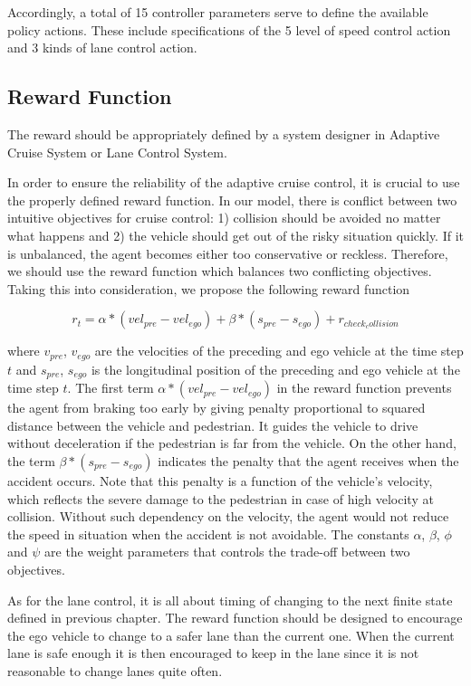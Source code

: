 Accordingly, a total of 15 controller parameters serve to define the available policy actions. These include specifications of the 5 level of speed control action and 3 kinds of lane control action.

\subsection{Reward Function}

The reward should be appropriately defined by a system designer in Adaptive Cruise System or Lane Control System.

In order to ensure the reliability of the adaptive cruise control, it is crucial to use the properly defined reward function. In our model, there is conflict between two intuitive objectives for cruise control: 1) collision should be avoided no matter what happens and 2) the vehicle should get out of the risky situation quickly. If it is unbalanced, the agent becomes either too conservative or reckless. Therefore, we should use the reward function which balances two conflicting objectives. Taking this into consideration, we propose the following reward function

\begin{equation} \label{eq:reward-func}
r_t = \alpha * (vel_{pre} - vel_{ego}) + \beta *  (s_{pre} - s_{ego}) + r_{check_collision}
\end{equation}

where $v_{pre}$, $v_{ego}$ are the velocities of the preceding and ego vehicle at the time step $t$ and $s_{pre}$, $s_{ego}$  is the longitudinal position of the preceding and ego vehicle at the time step $t$. The first term $ \alpha * (vel_{pre} - vel_{ego}) $ in the reward function prevents the agent from braking too early by giving penalty proportional to squared distance between the vehicle and pedestrian. It guides the vehicle to drive without deceleration if the pedestrian is far from the vehicle. On the other hand, the term $\beta *  (s_{pre} - s_{ego})$ indicates the penalty that the agent receives when the accident occurs. Note that this penalty is a function of the vehicle's velocity, which reflects the severe damage to the pedestrian in case of high velocity at collision. Without such dependency on the velocity, the agent would not reduce the speed in situation when the accident is not avoidable. The constants $\alpha$, $\beta$, $\phi$ and $\psi$ are the weight parameters that controls the trade-off between two objectives.

As for the lane control, it is all about timing of changing to the next finite state defined in previous chapter. The reward function should be designed to encourage the ego vehicle to change to a safer lane than the current one. When the current lane is safe enough it is then encouraged to keep in the lane since it is not reasonable to change lanes quite often.


